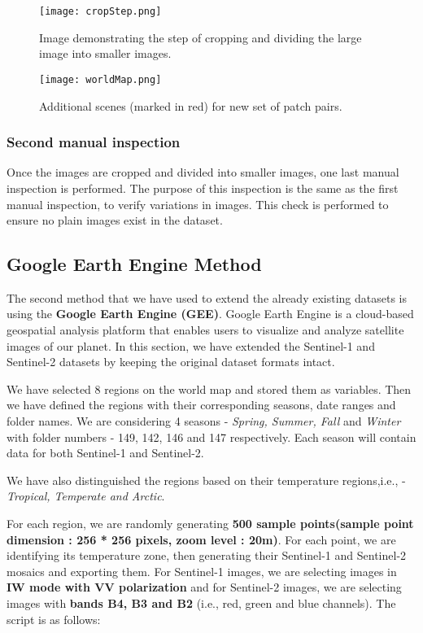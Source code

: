 \begin{figure*}
    \texttt{[image: cropStep.png]}
    \caption{Image demonstrating the step of cropping and dividing the large image into smaller images.}
    \label{fig:cropStep}
\end{figure*}

\begin{figure*}[t]
    \texttt{[image: worldMap.png]}
    \caption{Additional scenes (marked in red) for new set of patch pairs.}
    \label{fig:newMap}
\end{figure*}

\subsubsection{Second manual inspection}
Once the images are cropped and divided into smaller images, one last manual inspection is performed. The purpose of this inspection is the same as the first manual inspection, to verify variations in images. This check is performed to ensure no plain images exist in the dataset.

\subsection{Google Earth Engine Method}
The second method that we have used to extend the already existing datasets is using the \textbf{Google Earth Engine (GEE)}. Google Earth Engine is a cloud-based geospatial analysis platform that enables users to visualize and analyze satellite images of our planet. In this section, we have extended the Sentinel-1 and Sentinel-2 datasets by keeping the original dataset formats intact.

We have selected 8 regions on the world map and stored them as variables. Then we have defined the regions with their corresponding seasons, date ranges and folder names. We are considering 4 seasons - \textit{Spring, Summer, Fall} and \textit{Winter} with folder numbers - 149, 142, 146 and 147 respectively. Each season will contain data for both Sentinel-1 and Sentinel-2.

We have also distinguished the regions based on their temperature regions,i.e., - \textit{Tropical, Temperate and Arctic}.

For each region, we are randomly generating \textbf{500 sample points(sample point dimension : 256 * 256 pixels, zoom level : 20m)}. For each point, we are identifying its temperature zone, then generating their Sentinel-1 and Sentinel-2 mosaics and exporting them. For Sentinel-1 images, we are selecting images in \textbf{IW mode with VV polarization} and for Sentinel-2 images, we are selecting images with \textbf{bands B4, B3 and B2} (i.e., red, green and blue channels). The script is as follows:

